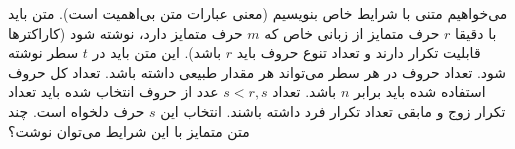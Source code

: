 \p
می‌خواهیم متنی با شرایط خاص بنویسیم
(معنی عبارات متن بی‌اهمیت است).
متن باید با دقیقا
$r$
حرف متمایز از زبانی خاص که
$m$
حرف متمایز دارد،
نوشته شود
(کاراکتر‌ها قابلیت تکرار دارند و تعداد تنوع حروف باید 
$r$
باشد).
این متن باید در 
$t$
سطر نوشته شود. تعداد حروف در هر سطر می‌تواند هر مقدار طبیعی داشته باشد.
تعداد کل حروف استفاده شده باید برابر
$n$
باشد.
تعداد
$s < r , s $
عدد از حروف انتخاب شده باید تعداد تکرار زوج و مابقی تعداد تکرار فرد داشته باشند.
انتخاب این
$s$
حرف دلخواه است.
چند متن متمایز با این شرایط می‌توان نوشت؟
